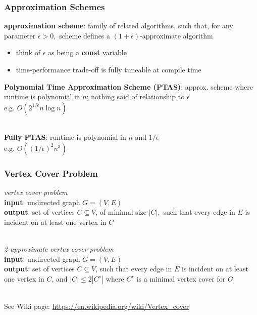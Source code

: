 \documentclass{beamer}
\newcommand{\stanza}{ \\~\ }
\begin{document}
\begin{frame} \frametitle{Approximation Schemes}
\textbf{approximation scheme}: family of related algorithms, such that, for
any parameter $\epsilon > 0,$ scheme defines a
$(1+\epsilon)$-approximate algorithm
\begin{itemize}
  \item think of $\epsilon$ as being a \textbf{const} variable
  \item time-performance trade-off is fully tuneable at compile time
\end{itemize}

\textbf{Polynomial Time Approximation Scheme (PTAS)}: approx. scheme where runtime
is polynomial in $n$; nothing said of relationship to $\epsilon$ \\
e.g. $O(2^{1/\epsilon} n \log n)$ \stanza

\textbf{Fully PTAS}: runtime is polynomial in $n$ and $1/\epsilon$ \\
e.g. $O((1/\epsilon)^2 n^3)$
\end{frame}

\begin{frame} \frametitle{Vertex Cover Problem}
\emph{vertex cover problem} \\
\textbf{input}: undirected graph $G=(V,E)$ \\
\textbf{output}: set of vertices $C \subseteq V$, of minimal size $|C|,$ such
  that every edge in $E$ is incident on at least one vertex in $C$
 \stanza

 \emph{2-approximate vertex cover problem} \\
 \textbf{input}: undirected graph $G=(V,E)$ \\
 \textbf{output}: set of vertices $C \subseteq V$, such
   that every edge in $E$ is incident on at least one vertex in $C$, and
   $|C| \leq 2 |C^\star|$ where $C^\star$ is a minimal vertex cover for $G$
  \stanza

See Wiki page: \url{https://en.wikipedia.org/wiki/Vertex_cover}
\end{frame}
\end{document}
